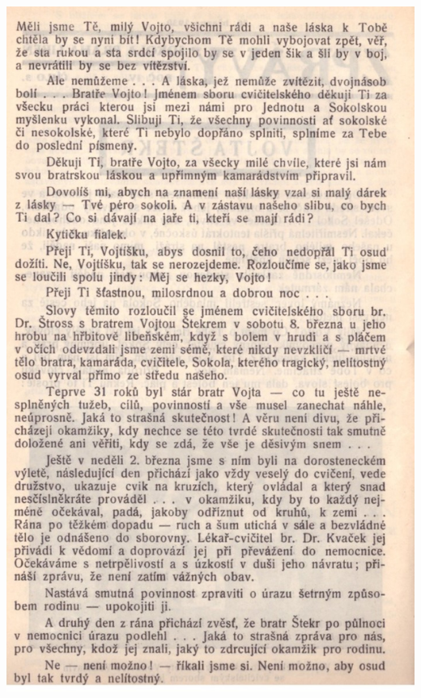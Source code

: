 \documentclass[11pt]{article}
\begin{document}
\includegraphics[width=\imagewidth]{original/1930/Skener_20250407 (V).jpg}
\end{document}
